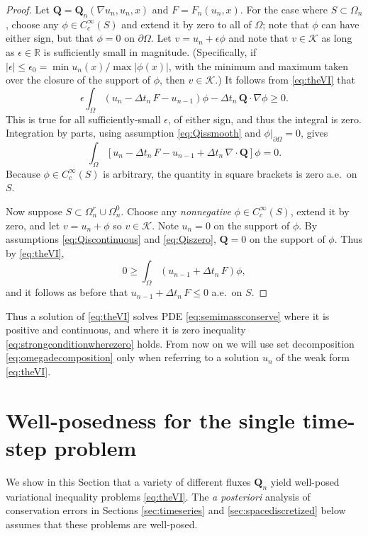 \documentclass[final,onefignum]{siamart190516}
\newcommand\bQ{\mathbf{Q}}
\newcommand{\Div}{\nabla\cdot}
\newcommand\eps{\epsilon}
\newcommand{\grad}{\nabla}
\newcommand\RR{\mathbb{R}}
\begin{document}
\begin{proof}  Let $\bQ = \bQ_n(\grad u_n,u_n,x)$ and $F=F_n(u_n,x)$.  For the case where $S \subset \Omega_n$, choose any $\phi\in C_c^\infty(S)$ and extend it by zero to all of $\Omega$; note that $\phi$ can have either sign, but that $\phi=0$ on $\partial\Omega$.  Let $v = u_n + \eps \phi$ and note that $v \in \mathcal{K}$ as long as $\eps\in\RR$ is sufficiently small in magnitude.  (Specifically, if $|\eps|\le \eps_0 = \min u_n(x) / \max |\phi(x)|$, with the minimum and maximum taken over the closure of the support of $\phi$, then $v \in \mathcal{K}$.)  It follows from \eqref{eq:theVI} that
   $$\eps \int_\Omega \left(u_n - \Delta t_n\,F - u_{n-1}\right)\phi - \Delta t_n\,\bQ \cdot \grad \phi \ge 0.$$
This is true for all sufficiently-small $\eps$, of either sign, and thus the integral is zero.  Integration by parts, using assumption \eqref{eq:Qissmooth} and $\phi\big|_{\partial\Omega}=0$, gives
   $$\int_\Omega \left[ u_n - \Delta t_n\,F - u_{n-1} + \Delta t_n\,\Div\bQ \right]\phi = 0.$$
Because $\phi\in C_c^\infty(S)$ is arbitrary, the quantity in square brackets is zero a.e.~on $S$.

Now suppose $S \subset \Omega_n^r \cup \Omega_n^0$.  Choose any \emph{nonnegative} $\phi\in C_c^\infty(S)$, extend it by zero, and let $v = u_n + \phi$ so $v\in\mathcal{K}$.  Note $u_n=0$ on the support of $\phi$.  By assumptions \eqref{eq:Qiscontinuous} and \eqref{eq:Qiszero}, $\bQ=0$ on the support of $\phi$.  Thus by \eqref{eq:theVI},
    $$0 \ge \int_{\Omega} \left(u_{n-1} + \Delta t_n\, F\right) \phi,$$
and it follows as before that $u_{n-1} + \Delta t_n\, F \le 0$ a.e.~on $S$. \end{proof}

Thus a solution of \eqref{eq:theVI} solves PDE \eqref{eq:semimassconserve} where it is positive and continuous, and where it is zero inequality \eqref{eq:strongconditionwherezero} holds.  From now on we will use set decomposition \eqref{eq:omegadecomposition} only when referring to a solution $u_n$ of the weak form \eqref{eq:theVI}.


\section{Well-posedness for the single time-step problem} \label{sec:wellposed}

We show in this Section that a variety of different fluxes $\bQ_n$ yield well-posed variational inequality problems \eqref{eq:theVI}.  The \emph{a posteriori} analysis of conservation errors in Sections \ref{sec:timeseries} and \ref{sec:spacediscretized} below assumes that these problems are well-posed.
\end{document}
